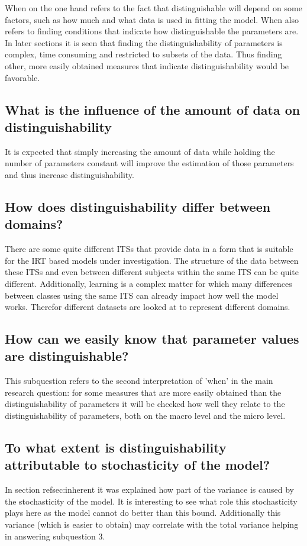 \documentclass{scrartcl}
\begin{document}
When on the one hand refers to the fact that distinguishable will depend on some factors, such as how much and what data is used in fitting the model. When also refers to finding conditions that indicate how distinguishable the parameters are. In later sections it is seen that finding the distinguishability of parameters is complex, time consuming and restricted to subsets of the data. Thus finding other, more easily obtained measures that indicate distinguishability would be favorable.

\subsection{What is the influence of the amount of data on distinguishability}
It is expected that simply increasing the amount of data while holding the number of parameters constant will improve the estimation of those parameters and thus increase distinguishability. 

\subsection{How does distinguishability differ between domains?}
There are some quite different ITSs that provide data in a form that is suitable for the IRT based models under investigation. The structure of the data between these ITSs and even between different subjects within the same ITS can be quite different. Additionally, learning is a complex matter for which many differences between classes using the same ITS can already impact how well the model works. Therefor different datasets are looked at to represent different domains.

\subsection{How can we easily know that parameter values are distinguishable?}
This subquestion refers to the second interpretation of 'when' in the main research question: for some measures that are more easily obtained than the distinguishability of parameters it will be checked how well they relate to the distinguishability of parameters, both on the macro level and the micro level.

\subsection{To what extent is distinguishability attributable to stochasticity of the model?}
In section ref{sec:inherent} it was explained how part of the variance is caused by the stochasticity of the model. It is interesting to see what role this stochasticity plays here as the model cannot do better than this bound. Additionally this variance (which is easier to obtain) may correlate with the total variance helping in answering subquestion 3.
\end{document}
